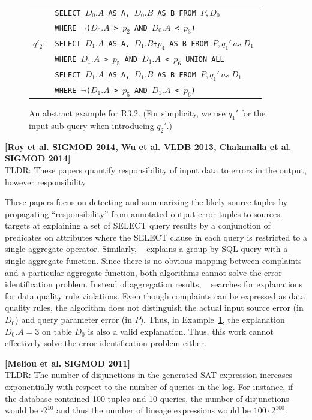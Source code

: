 \begin{figure}[t]
\begin{minipage}[t]{0.22\textwidth}
\begin{tabular}{p{2ex}p{55ex}}
        & \texttt{\small SELECT $D_0.A$ AS A, $D_0.B$ AS B FROM $P, D_0$ }\\
        &\texttt{\small  WHERE $\neg$($D_0.A$ > $p_2$ AND $D_0.A$ < $p_3$)} \\
        $q'_2:$ &
         \texttt{\small SELECT $D_1.A$ AS A, $D_1.B$+$p_4$ AS B FROM $P, q_1'\ as\ D_1$ } \\
        & \texttt{\small WHERE $D_1.A$ > $p_5$ AND $D_1.A$ < $p_6$ UNION ALL}\\
        & \texttt{\small SELECT $D_1.A$ AS A, $D_1.B$ AS B FROM $P, q_1'\ as\ D_1$ }\\
        &\texttt{\small  WHERE $\neg$($D_1.A$ > $p_5$ AND $D_1.A$ < $p_6$)} \\
        \end{tabular}
    \end{minipage}
    \caption{An abstract example for R3.2. (For simplicity, we use $q_1'$ for the input sub-query when introducing $q_2'$.)}
\label{fig:example}
\end{figure}

\noindent \textbf{[Roy et al. SIGMOD 2014, Wu et al. VLDB 2013, Chalamalla et al. SIGMOD 2014]} \\
TLDR: These papers quantify responsibility of input data to errors in the output, however responsibility


These papers focus on detecting and summarizing the likely source tuples by propagating ``responsibility'' from annotated output error tuples to sources. ~\cite{Wu13} targets at explaining a set of SELECT query results by a conjunction of predicates on attributes where the SELECT clause in each query is restricted to a single aggregate operator. 
Similarly, ~\cite{roy2014formal} explains a group-by SQL query with a single aggregate function. Since there is no obvious mapping between complaints and a particular aggregate function, both algorithms cannot solve the error identification problem. Instead of aggregation results, ~\cite{chalamalla2014} searches for explanations for data quality rule violations. Even though complaints can be expressed as data quality rules, the algorithm does not distinguish the actual input source error (in $D_0$) and query parameter error (in $P$). Thus, in Example~\ref{fig:example}, the explanation $D_0.A = 3$ on table $D_0$ is also a valid explanation. Thus, this work cannot effectively solve the error identification problem either.

\noindent \textbf{[Meliou et al. SIGMOD 2011]} \\
TLDR: The number of disjunctions in the generated SAT expression increases exponentially with respect to the number of queries in the log.  For instance, if the database contained 100 tuples and 10 queries, the number of disjunctions would be $\cdot 2^{10}$ and thus the number of lineage expressions would be $100\cdot 2^{100}$.

